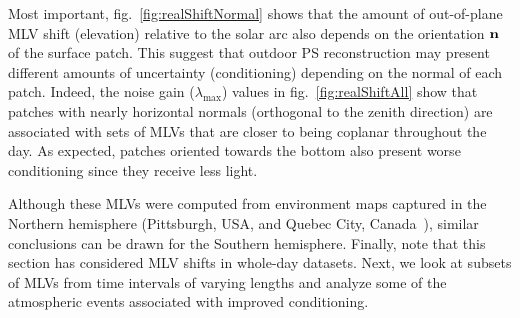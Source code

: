 Most important, fig.~\ref{fig:realShiftNormal} shows that the amount of out-of-plane MLV shift (elevation) relative to the solar arc also depends on the orientation ${\bf n}$ of the surface patch. This suggest that outdoor PS reconstruction may present different amounts of uncertainty (conditioning) depending on the normal of each patch. Indeed, the noise gain ($\lambda_{\max}$) values in fig.~\ref{fig:realShiftAll} show that patches with nearly horizontal normals (orthogonal to the zenith direction) are associated with sets of MLVs that are closer to being coplanar throughout the day. As expected, patches oriented towards the bottom also present worse conditioning since they receive less light.


Although these MLVs were computed from environment maps captured in the Northern hemisphere (Pittsburgh, USA, and Quebec City, Canada~\cite{holdgeoffroy-iccp-15}), similar conclusions can be drawn for the Southern hemisphere. Finally, note that this section has considered MLV shifts in whole-day datasets. Next, we look at subsets of MLVs from time intervals of varying lengths and analyze some of the atmospheric events associated with improved conditioning.



